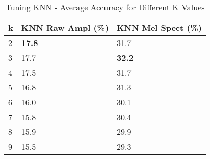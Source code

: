 \documentclass[11pt]{article}
\begin{document}

\begin{table}[h!]
\centering
\begin{tabular}{lll}
\toprule
k & KNN Raw Ampl (\%) & KNN Mel Spect (\%) \\ \midrule
2 & \textbf{17.8}     & 31.7               \\
3 & 17.7              & \textbf{32.2}      \\
4 & 17.5              & 31.7               \\
5 & 16.8              & 31.3               \\
6 & 16.0              & 30.1               \\
7 & 15.8              & 30.4               \\
8 & 15.9              & 29.9               \\
9 & 15.5              & 29.3               \\ \bottomrule
\end{tabular}
\caption{\label{tab:6} Tuning KNN - Average Accuracy for Different K Values}
\end{table}
\end{document}
